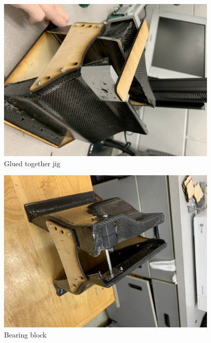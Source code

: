 \begin{figure}[htp]
\centering
\includegraphics[width=0.95\textwidth, angle=0]{Meetings/February/02-17-22/2-17-22_Hardware_Figure1 - Nathan Forrer.JPG}
\caption{Glued together jig}
\label{fig:021722_3}
\end{figure}

\begin{figure}[htp]
\centering
\includegraphics[width=0.95\textwidth, angle=0]{Meetings/February/02-17-22/2-17-22_Hardware_Figure2 - Nathan Forrer.JPG}
\caption{Bearing block}
\label{fig:021722_4}
\end{figure}




